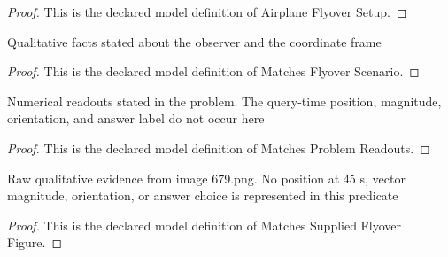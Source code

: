 \begin{proof}
  This is the declared model definition of Airplane Flyover Setup.
\end{proof}
\begin{definition}
  \label{def:physics:phyx-mini-0679:phyxminiproblems-problemphyxmini0679-matchesflyoverscenario}
  Qualitative facts stated about the observer and the coordinate frame
\end{definition}
\begin{proof}
  This is the declared model definition of Matches Flyover Scenario.
\end{proof}
\begin{definition}
  \label{def:physics:phyx-mini-0679:phyxminiproblems-problemphyxmini0679-matchesproblemreadouts}
  Numerical readouts stated in the problem. The query-time position, magnitude, orientation, and answer label do not occur here
\end{definition}
\begin{proof}
  This is the declared model definition of Matches Problem Readouts.
\end{proof}
\begin{definition}
  \label{def:physics:phyx-mini-0679:phyxminiproblems-problemphyxmini0679-matchessuppliedflyoverfigure}
  Raw qualitative evidence from image 679.png. No position at 45 s, vector magnitude, orientation, or answer choice is represented in this predicate
\end{definition}
\begin{proof}
  This is the declared model definition of Matches Supplied Flyover Figure.
\end{proof}
